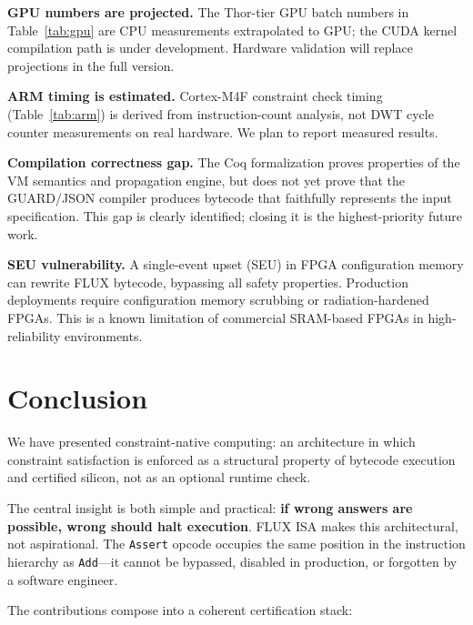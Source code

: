 \documentclass[sigplan,10pt,review]{acmart}
\begin{document}
\textbf{GPU numbers are projected.} The Thor-tier GPU batch numbers in
Table~\ref{tab:gpu} are CPU measurements extrapolated to GPU; the CUDA kernel
compilation path is under development. Hardware validation will replace projections
in the full version.

\textbf{ARM timing is estimated.} Cortex-M4F constraint check timing
(Table~\ref{tab:arm}) is derived from instruction-count analysis, not DWT cycle
counter measurements on real hardware. We plan to report measured results.

\textbf{Compilation correctness gap.} The Coq formalization proves properties of the
VM semantics and propagation engine, but does not yet prove that the GUARD/JSON
compiler produces bytecode that faithfully represents the input specification. This
gap is clearly identified; closing it is the highest-priority future work.

\textbf{SEU vulnerability.} A single-event upset (SEU) in FPGA configuration memory
can rewrite FLUX bytecode, bypassing all safety properties. Production deployments
require configuration memory scrubbing or radiation-hardened FPGAs. This is a known
limitation of commercial SRAM-based FPGAs in high-reliability environments.

\section{Conclusion}
\label{sec:conclusion}

We have presented constraint-native computing: an architecture in which constraint
satisfaction is enforced as a structural property of bytecode execution and certified
silicon, not as an optional runtime check.

The central insight is both simple and practical: \textbf{if wrong answers are
possible, wrong should halt execution}. FLUX ISA makes this architectural, not
aspirational. The \texttt{Assert} opcode occupies the same position in the
instruction hierarchy as \texttt{Add}---it cannot be bypassed, disabled in
production, or forgotten by a software engineer.

The contributions compose into a coherent certification stack:
\end{document}
